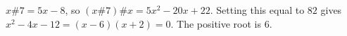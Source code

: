 $x\#7=5x-8$, so $(x\#7)\#x=5x^2-20x+22$. Setting this equal to $82$ gives $x^2-4x-12=(x-6)(x+2)=0$. The positive root is $\boxed6$.

